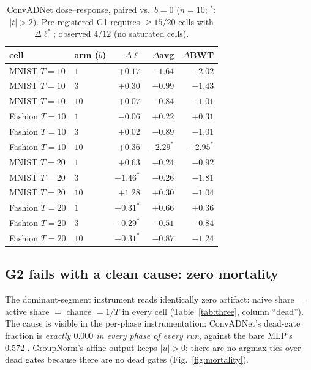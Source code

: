 \documentclass[review]{elsarticle}
\begin{document}
\begin{table}[t]
\centering\small
\caption{ConvADNet dose--response, paired vs.\ $b{=}0$ ($n{=}10$;
$^{*}$: $|t|>2$). Pre-registered G1 requires $\ge 15/20$ cells with
$\Delta\ell^{*}$; observed $4/12$ (no saturated cells).}
\label{tab:convdose}
\begin{tabular}{llrrr}
\toprule
cell & arm ($b$) & $\Delta\ell$ & $\Delta$avg & $\Delta$BWT \\
\midrule
MNIST $T{=}10$ & $1$ & $+0.17$ & $-1.64$ & $-2.02$ \\
MNIST $T{=}10$ & $3$ & $+0.30$ & $-0.99$ & $-1.43$ \\
MNIST $T{=}10$ & $10$ & $+0.07$ & $-0.84$ & $-1.01$ \\
Fashion $T{=}10$ & $1$ & $-0.06$ & $+0.22$ & $+0.31$ \\
Fashion $T{=}10$ & $3$ & $+0.02$ & $-0.89$ & $-1.01$ \\
Fashion $T{=}10$ & $10$ & $+0.36$ & $-2.29^{*}$ & $-2.95^{*}$ \\
MNIST $T{=}20$ & $1$ & $+0.63$ & $-0.24$ & $-0.92$ \\
MNIST $T{=}20$ & $3$ & $+1.46^{*}$ & $-0.26$ & $-1.81$ \\
MNIST $T{=}20$ & $10$ & $+1.28$ & $+0.30$ & $-1.04$ \\
Fashion $T{=}20$ & $1$ & $+0.31^{*}$ & $+0.66$ & $+0.36$ \\
Fashion $T{=}20$ & $3$ & $+0.29^{*}$ & $-0.51$ & $-0.84$ \\
Fashion $T{=}20$ & $10$ & $+0.31^{*}$ & $-0.87$ & $-1.24$ \\
\bottomrule
\end{tabular}
\end{table}

\subsection{G2 fails with a clean cause: zero mortality}
\label{sec:zeromort}

The dominant-segment instrument reads identically zero artifact:
naive share $=$ active share $=$ chance $= 1/T$ in every cell
(Table~\ref{tab:three}, column ``dead''). The cause is visible in the
per-phase instrumentation: ConvADNet's dead-gate fraction is
\emph{exactly $0.000$ in every phase of every run}, against the bare
MLP's $0.572$ \cite{zhou2026delpS1}. GroupNorm's affine output keeps
$|u| > 0$; there are no argmax ties over dead gates because there are
no dead gates (Fig.~\ref{fig:mortality}).
\end{document}
